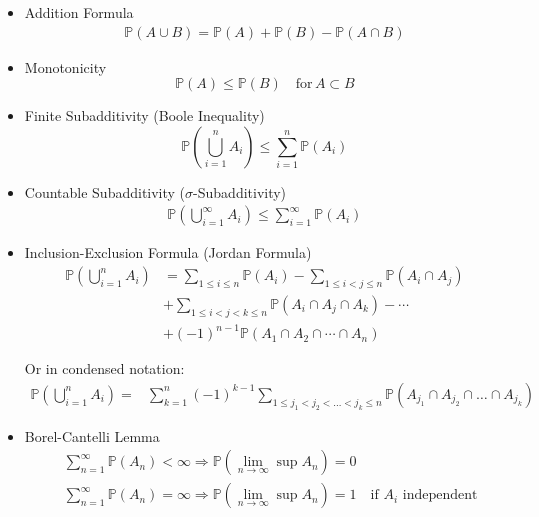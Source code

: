     \begin{itemize}
        \item Addition Formula
        \begin{align}
            \mathbb{P}\left( A\cup B \right) =\mathbb{P}\left( A \right) +\mathbb{P}\left( B \right) -\mathbb{P}\left( A\cap B \right)  
        \end{align}
        \item Monotonicity
        \begin{equation}    
            \mathbb{P}(A)\leq \mathbb{P}(B)\quad \text{for}\, A\subset B
        \end{equation}
        \item Finite Subadditivity (Boole Inequality)
        \begin{equation}    
            \mathbb{P}(\bigcup_{i=1}^nA_i)\leq\sum_{i=1}^n \mathbb{P}(A_i)    
        \end{equation}
        \item Countable Subadditivity ($ \sigma  $-Subadditivity)
        \begin{align}
            \mathbb{P}(\bigcup_{i=1}^\infty A_i)\leq\sum_{i=1}^\infty \mathbb{P}(A_i)  
        \end{align}
        
        
        \item Inclusion-Exclusion Formula (Jordan Formula)
        \begin{align}
            \mathbb{P}(\bigcup_{i=1}^nA_i)&=\sum_{1\leq i\leq n}\mathbb{P}(A_i)-\sum_{1\leq i<j\leq n}\mathbb{P}(A_i\cap A_j)\\
            &+\sum_{1\leq i<j<k\leq n}\mathbb{P}(A_i\cap A_j\cap A_k)-\cdots\\
            &+(-1)^{n-1}\mathbb{P}(A_1 \cap A_2\cap\cdots \cap A_n)
        \end{align}

        Or in condensed notation:
        \begin{align}
            \mathbb{P}( \bigcup_{i=1}^n A_i)=&\sum_{k=1}^n (-1)^{k-1}\sum_{1\leq j_1<j_2<\ldots<j_k\leq n}\mathbb{P}\left( A_{j_1}\cap A_{j_2}\cap\ldots\cap A_{j_k} \right)   
        \end{align}
        
        
        \item Borel-Cantelli Lemma
        \begin{align}
            &\sum_{n=1}^\infty \mathbb{P}(A_n)<\infty\Rightarrow \mathbb{P}(\lim_{n\to\infty}\sup A_n)=0\\
            &\sum_{n=1}^\infty \mathbb{P}(A_n)=\infty\Rightarrow \mathbb{P}(\lim_{n\to\infty}\sup A_n)=1\quad \text{if }A_i\text{ independent}
        \end{align}
            
    \end{itemize}


